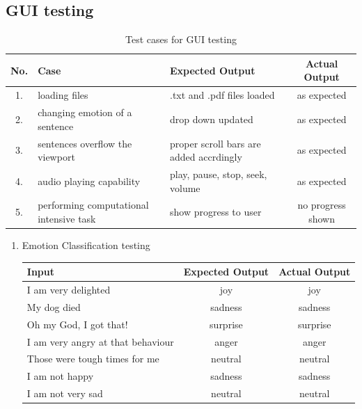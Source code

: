 \documentclass[oneside,a4paper,12pt]{book}
\begin{document}
\begin{appendices}
\subsection{GUI testing}
\begin{table}[!htbp]
	\def\arraystretch{1.5}
	\begin{tabularx}{\textwidth}{|c|X|X|c|}
		\hline 
		No. & Case	& Expected Output & Actual Output \\ \hline
		1. & loading files & .txt and .pdf files loaded & as expected \\ \hline
		2. & changing emotion of a sentence & drop down updated & as expected \\ \hline
		3. & sentences overflow the viewport & proper scroll bars are added accrdingly & as expected \\ \hline
		4. & audio playing capability & play, pause, stop, seek, volume & as expected \\ \hline
		5. & performing computational intensive task & show progress to user & no progress shown \\ \hline
	\end{tabularx}
	\caption{Test cases for GUI testing}
	\label{tab:testcases}
\end{table}

\begin{enumerate}
\item[] Emotion Classification testing\\
\begin{table}[!htbp]
	\begin{center}
		\def\arraystretch{1.5}
		\begin{tabularx}{\textwidth}{|X|c|c|}
			\hline 
			Input	& Expected Output & Actual Output \\ \hline
			I am very delighted & joy & joy \\ \hline
			My dog died & sadness & sadness \\ \hline
			Oh my God, I got that! & surprise & surprise \\ \hline
			I am very angry at that behaviour & anger & anger \\ \hline
			Those were tough times for me & neutral & neutral \\ \hline
			I am not happy & sadness & sadness \\ \hline
			I am not very sad & neutral & neutral \\ \hline
		\end{tabularx}
	\end{center}
	\label{tab:testcases}
\end{table}



\end{enumerate}
\end{appendices}
\end{document}
